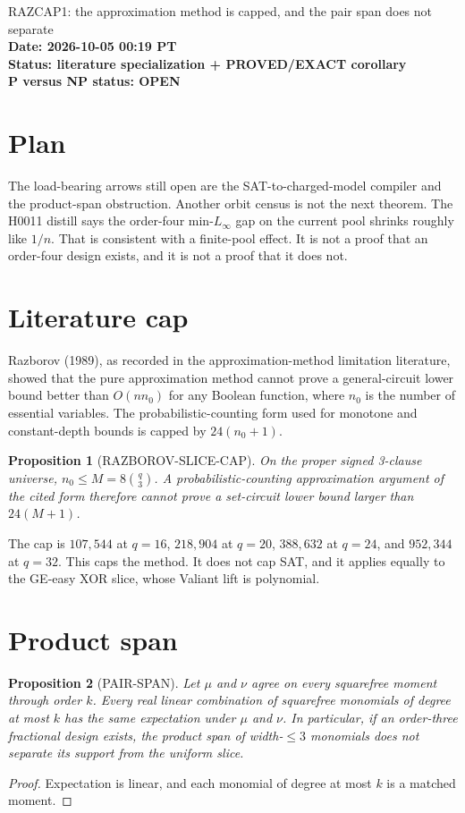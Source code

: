 \documentclass[11pt]{article}
\newtheorem{proposition}{Proposition}
\begin{document}
\begin{center}
{\Large RAZCAP1: the approximation method is capped, and the pair span does not separate}\\[4pt]
\textbf{Date: 2026-10-05 00:19 PT}\\
\textbf{Status: literature specialization + PROVED/EXACT corollary}\\
\textbf{P versus NP status: OPEN}
\end{center}

\section{Plan}
The load-bearing arrows still open are the SAT-to-charged-model compiler and the product-span obstruction. Another orbit census is not the next theorem. The H0011 distill says the order-four min-$L_\infty$ gap on the current pool shrinks roughly like $1/n$. That is consistent with a finite-pool effect. It is not a proof that an order-four design exists, and it is not a proof that it does not.

\section{Literature cap}
Razborov (1989), as recorded in the approximation-method limitation literature, showed that the pure approximation method cannot prove a general-circuit lower bound better than $O(nn_0)$ for any Boolean function, where $n_0$ is the number of essential variables. The probabilistic-counting form used for monotone and constant-depth bounds is capped by $24(n_0+1)$.

\begin{proposition}[RAZBOROV-SLICE-CAP]
On the proper signed 3-clause universe, $n_0\le M=8\binom q3$. A probabilistic-counting approximation argument of the cited form therefore cannot prove a set-circuit lower bound larger than $24(M+1)$.
\end{proposition}

The cap is $107{,}544$ at $q=16$, $218{,}904$ at $q=20$, $388{,}632$ at $q=24$, and $952{,}344$ at $q=32$. This caps the method. It does not cap SAT, and it applies equally to the GE-easy XOR slice, whose Valiant lift is polynomial.

\section{Product span}
\begin{proposition}[PAIR-SPAN]
Let $\mu$ and $\nu$ agree on every squarefree moment through order $k$. Every real linear combination of squarefree monomials of degree at most $k$ has the same expectation under $\mu$ and $\nu$. In particular, if an order-three fractional design exists, the product span of width-$\le 3$ monomials does not separate its support from the uniform slice.
\end{proposition}
\begin{proof}
Expectation is linear, and each monomial of degree at most $k$ is a matched moment.
\end{proof}
\end{document}
